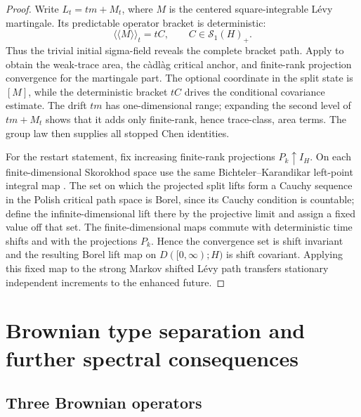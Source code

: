 \documentclass[10pt,reqno]{amsart}
\theoremstyle{plain}
\theoremstyle{definition}
\theoremstyle{remark}
\begin{document}
\begin{proof}
Write $L_t=tm+M_t$, where $M$ is the centered square-integrable L\'evy
martingale.  Its predictable operator bracket is deterministic:
\[
 \langle\!\langle M\rangle\!\rangle_t=tC,
 \qquad C\in\mathcal S_1(H)_+.
\]
Thus the trivial initial sigma-field reveals the complete bracket path.
Apply 
to obtain the weak-trace area, the c\`adl\`ag critical anchor, and finite-rank
projection convergence for the martingale part.  The optional coordinate in
the split state is $[M]$, while the deterministic bracket $tC$ drives the
conditional covariance estimate.  The drift $tm$ has one-dimensional range;
expanding the second level of $tm+M_t$ shows that it adds only finite-rank,
hence trace-class, area terms.  The group law then supplies all stopped Chen
identities.

For the restart statement, fix increasing finite-rank projections
$P_k\uparrow I_H$.  On each finite-dimensional Skorokhod space use the same
Bichteler--Karandikar left-point integral map
\cite{Karandikar95,Chevyrev18,ChevyrevFriz19}.  The set on which the projected
split lifts form a Cauchy sequence in the Polish critical path space is Borel,
since its Cauchy condition is countable; define the infinite-dimensional lift
there by the projective limit and assign a fixed value off that set.  The
finite-dimensional maps commute with deterministic time shifts and with the
projections $P_k$.  Hence the convergence set is shift invariant and the
resulting Borel lift map on $D([0,\infty);H)$ is shift covariant.  Applying
this fixed map to the strong Markov shifted L\'evy path transfers stationary
independent increments to the enhanced future.
\end{proof}

\section{Brownian type separation and further spectral consequences}
\label{sec:brownian-boundaries}

\subsection{Three Brownian operators}
\end{document}
